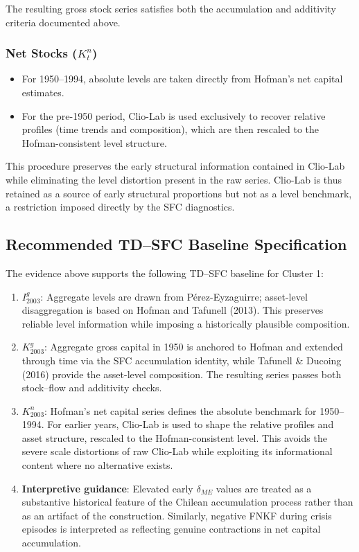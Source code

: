The resulting gross stock series satisfies both the accumulation and additivity criteria documented above.

\subsubsection*{Net Stocks (\(K^n_t\))}

\begin{itemize}
    \item For 1950--1994, absolute levels are taken directly from Hofman’s net capital estimates.
    \item For the pre-1950 period, Clio-Lab is used exclusively to recover relative profiles (time trends and composition), which are then rescaled to the Hofman-consistent level structure.
\end{itemize}

This procedure preserves the early structural information contained in Clio-Lab while eliminating the level distortion present in the raw series. Clio-Lab is thus retained as a source of early structural proportions but not as a level benchmark, a restriction imposed directly by the SFC diagnostics.

\subsection{Recommended TD--SFC Baseline Specification}

The evidence above supports the following TD--SFC baseline for Cluster 1:

\begin{enumerate}
    \item \textbf{\(I^g_{2003}\)}: Aggregate levels are drawn from Pérez-Eyzaguirre; asset-level disaggregation is based on Hofman and Tafunell (2013). This preserves reliable level information while imposing a historically plausible composition.
    \item \textbf{\(K^g_{2003}\)}: Aggregate gross capital in 1950 is anchored to Hofman and extended through time via the SFC accumulation identity, while Tafunell \& Ducoing (2016) provide the asset-level composition. The resulting series passes both stock--flow and additivity checks.
    \item \textbf{\(K^n_{2003}\)}: Hofman’s net capital series defines the absolute benchmark for 1950--1994. For earlier years, Clio-Lab is used to shape the relative profiles and asset structure, rescaled to the Hofman-consistent level. This avoids the severe scale distortions of raw Clio-Lab while exploiting its informational content where no alternative exists.
    \item \textbf{Interpretive guidance}: Elevated early \(\delta_{ME}\) values are treated as a substantive historical feature of the Chilean accumulation process rather than as an artifact of the construction. Similarly, negative FNKF during crisis episodes is interpreted as reflecting genuine contractions in net capital accumulation.
\end{enumerate}

